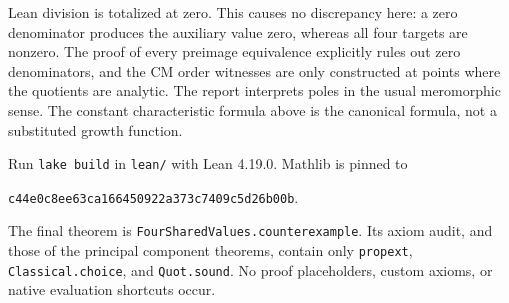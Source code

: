 \documentclass[11pt]{article}
\begin{document}
Lean division is totalized at zero. This causes no discrepancy here: a zero denominator produces the auxiliary value zero, whereas all four targets are nonzero. The proof of every preimage equivalence explicitly rules out zero denominators, and the CM order witnesses are only constructed at points where the quotients are analytic. The report interprets poles in the usual meromorphic sense. The constant characteristic formula above is the canonical formula, not a substituted growth function.

Run \texttt{lake build} in \texttt{lean/} with Lean 4.19.0. Mathlib is pinned to
\begin{center}\texttt{c44e0c8ee63ca166450922a373c7409c5d26b00b}.\end{center}
The final theorem is \texttt{FourSharedValues.counterexample}. Its axiom audit, and those of the principal component theorems, contain only \texttt{propext}, \texttt{Classical.choice}, and \texttt{Quot.sound}. No proof placeholders, custom axioms, or native evaluation shortcuts occur.
\end{document}
